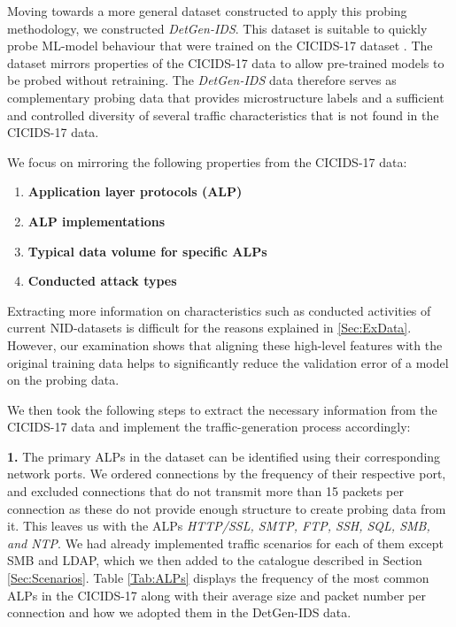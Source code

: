 \documentclass[runningheads]{llncs}
\begin{document}

Moving towards a more general dataset constructed to apply this probing methodology, 
we constructed \textit{DetGen-IDS}. This dataset is suitable to quickly probe ML-model behaviour that were trained on the CICIDS-17 dataset \cite{sharafaldin2018toward}. The dataset mirrors properties of the CICIDS-17 data to allow pre-trained models to be probed without retraining.
The \textit{DetGen-IDS} data therefore serves as complementary probing data that provides microstructure labels and a sufficient and controlled diversity of several traffic characteristics that is not found in the CICIDS-17 data.

We focus on mirroring the following properties from the CICIDS-17 data:
\begin{enumerate}

\item \textbf{Application layer protocols (ALP)}
\item \textbf{ALP implementations}
\item \textbf{Typical data volume for specific ALPs}
\item \textbf{Conducted attack types}

\end{enumerate}

Extracting more information on characteristics such as conducted activities of current NID-datasets is difficult for the reasons explained in \ref{Sec:ExData}. However, our examination shows that aligning these high-level features with the original training data helps to significantly reduce the validation error of a model on the probing data.

We then took the following steps to extract the necessary information from the CICIDS-17 data and implement the traffic-generation process accordingly:

\textbf{1.} The primary ALPs in the dataset can be identified using their corresponding network ports. We ordered connections by the frequency of their respective port, and excluded connections that do not transmit more than 15 packets per connection as these do not provide enough structure to create probing data from it. This leaves us with the ALPs \textit{HTTP/SSL, SMTP, FTP, SSH, SQL, SMB, and NTP}. We had already implemented traffic scenarios for each of them except SMB and LDAP, which we then added to the catalogue described in Section \ref{Sec:Scenarios}. Table \ref{Tab:ALPs} displays the frequency of the most common ALPs in the CICIDS-17 along with their average size and packet number per connection and how we adopted them in the DetGen-IDS data.
\end{document}
